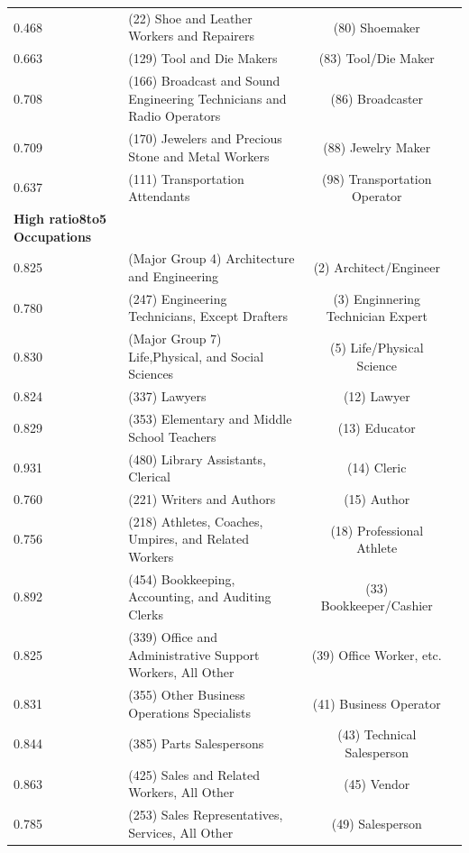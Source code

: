 \begin{table}[htpb]
\begin{tabular}{llcc}
 0.468 &  (22) Shoe and Leather Workers and Repairers &(80) Shoemaker\\[.5em]
 0.663 &  (129) Tool and Die Makers &(83) Tool/Die Maker\\[.5em]
 0.708 & (166)  Broadcast and Sound Engineering Technicians and Radio Operators &(86) Broadcaster\\[.5em]
 0.709 & (170) Jewelers and Precious Stone and Metal Workers &(88) Jewelry Maker\\[.5em]

 0.637 & (111) Transportation Attendants &(98) Transportation Operator\\[.5em]

\textbf{High ratio8to5 Occupations} &   \\[.5em]


 0.825  &    (Major Group 4)  Architecture and Engineering   &(2) Architect/Engineer\\[.5em]
 0.780  & (247) Engineering Technicians, Except Drafters &(3) Enginnering Technician Expert\\[.5em]
 0.830       & (Major Group 7) Life,Physical, and Social Sciences                                                &(5) Life/Physical Science\\[.5em]
 
 0.824  &  (337) Lawyers                                  &(12) Lawyer\\[.5em]
 0.829  &  (353) Elementary and Middle School Teachers  &(13) Educator\\[.5em]
 0.931  &  (480) Library Assistants, Clerical  &(14) Cleric\\[.5em]
 0.760  &  (221) Writers and Authors  &(15) Author\\[.5em]
 0.756  &  (218) Athletes, Coaches, Umpires, and Related Workers  &(18) Professional Athlete\\[.5em]

 0.892 &  (454) Bookkeeping, Accounting, and Auditing Clerks         &(33) Bookkeeper/Cashier\\[.5em]
 0.825 &  (339) Office and Administrative Support Workers, All Other &(39) Office Worker, etc.\\[.5em]

 0.831 &  (355) Other Business Operations Specialists      &(41) Business Operator\\[.5em]
 0.844 &  (385) Parts Salespersons                         &(43) Technical Salesperson\\[.5em]
 0.863 &  (425) Sales and Related Workers, All Other       &(45) Vendor\\[.5em]
 0.785 &  (253) Sales Representatives, Services, All Other &(49) Salesperson\\[.5em]


\end{tabular}
\end{table}
